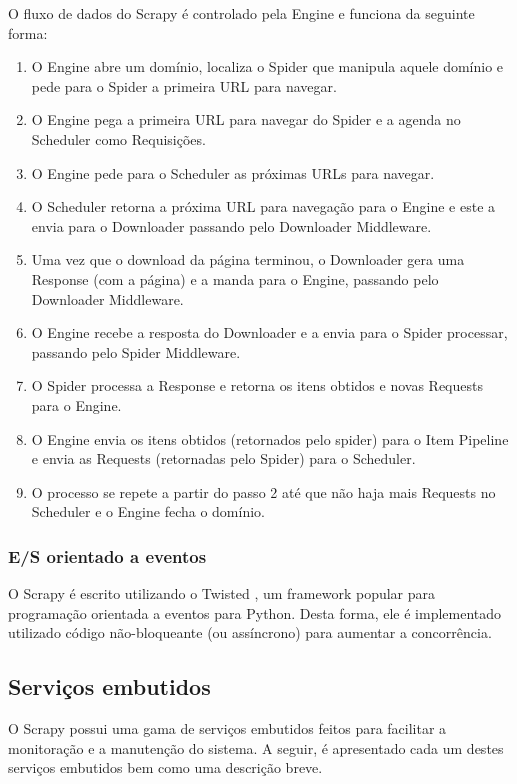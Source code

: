 O fluxo de dados do Scrapy é controlado pela Engine e funciona da seguinte forma:

\begin{enumerate}
	\item O Engine abre um domínio, localiza o Spider que manipula aquele domínio e pede para o Spider a primeira URL para navegar.
	\item O Engine pega a primeira URL para navegar do Spider e a agenda no Scheduler como Requisições.
	\item O Engine pede para o Scheduler as próximas URLs para navegar.
	\item O Scheduler retorna a próxima URL para navegação para o Engine e este a envia para o Downloader passando pelo Downloader Middleware.
	\item Uma vez que o download da página terminou, o Downloader gera uma Response (com a página) e a manda para o Engine, passando pelo Downloader Middleware.
	\item O Engine recebe a resposta do Downloader e a envia para o Spider processar, passando pelo Spider Middleware.
	\item O Spider processa a Response e retorna os itens obtidos e novas Requests para o Engine.
	\item O Engine envia os itens obtidos (retornados pelo spider) para o Item Pipeline e envia as Requests (retornadas pelo Spider) para o Scheduler.
	\item O processo se repete a partir do passo 2 até que não haja mais Requests no Scheduler e o Engine fecha o domínio.
\end{enumerate}

\subsubsection{E/S orientado a eventos}

O Scrapy é escrito utilizando o Twisted \cite{twisted}, um framework popular para programação orientada a eventos para Python. Desta forma, ele é implementado utilizado código não-bloqueante (ou assíncrono) para aumentar a concorrência.

\subsection{Serviços embutidos}

O Scrapy possui uma gama de serviços embutidos feitos para facilitar a monitoração e a manutenção do sistema. A seguir, é apresentado cada um destes serviços embutidos bem como uma descrição breve.

